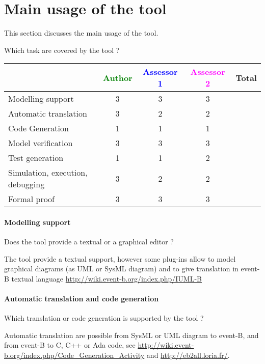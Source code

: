 \section{Main usage of the tool}
\label{main_usage}

This section discusses the main usage of the tool.

Which task are covered by the tool ?


\begin{tabular}{|l | c | c | c | c|}
\hline
& \textcolor{green}{Author} & \textcolor{blue}{Assessor 1} & \textcolor{magenta}{Assessor 2} & Total \\
\hline 
Modelling support & 3 & 3 & 3 &  \\
\hline
Automatic translation  & 3 & 2 & 2 & \\
\hline
Code Generation  & 1 & 1 & 1 & \\
\hline
Model verification & 3 & 3 & 3 & \\
\hline
Test generation & 1 & 1 & 2 & \\
\hline
Simulation, execution, debugging & 3 & 2 & 2 & \\
\hline
Formal proof & 3 & 3 & 3 & \\
\hline
\end{tabular}

\paragraph{Modelling support}
Does the tool provide a  textual or a graphical editor ?


\begin{author_comment}
The tool provide a textual support, however some plug-ins allow to  model graphical diagrams (as UML or SysML diagram) and to give translation in event-B textual language \url{http://wiki.event-b.org/index.php/IUML-B}
\end{author_comment}



\paragraph{Automatic translation and code generation}
Which translation or code generation is supported by the tool ?

\begin{author_comment}
Automatic translation are possible from SysML  or UML diagram to event-B, and from event-B to C, C++  or Ada code, see \url{http://wiki.event-b.org/index.php/Code_Generation_Activity} and \url{http://eb2all.loria.fr/}.
\end{author_comment}


